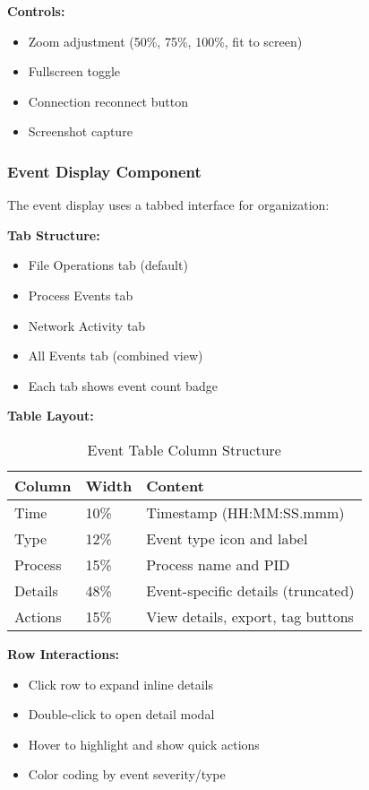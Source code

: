 \textbf{Controls:}
\begin{itemize}
    \item Zoom adjustment (50\%, 75\%, 100\%, fit to screen)
    \item Fullscreen toggle
    \item Connection reconnect button
    \item Screenshot capture
\end{itemize}

\subsubsection{Event Display Component}

The event display uses a tabbed interface for organization:

\textbf{Tab Structure:}
\begin{itemize}
    \item File Operations tab (default)
    \item Process Events tab
    \item Network Activity tab
    \item All Events tab (combined view)
    \item Each tab shows event count badge
\end{itemize}

\textbf{Table Layout:}
\begin{table}[h]
\centering
\small
\begin{tabular}{|l|l|p{6cm}|}
\hline
\textbf{Column} & \textbf{Width} & \textbf{Content} \\
\hline
Time & 10\% & Timestamp (HH:MM:SS.mmm) \\
Type & 12\% & Event type icon and label \\
Process & 15\% & Process name and PID \\
Details & 48\% & Event-specific details (truncated) \\
Actions & 15\% & View details, export, tag buttons \\
\hline
\end{tabular}
\caption{Event Table Column Structure}
\end{table}

\textbf{Row Interactions:}
\begin{itemize}
    \item Click row to expand inline details
    \item Double-click to open detail modal
    \item Hover to highlight and show quick actions
    \item Color coding by event severity/type
\end{itemize}

